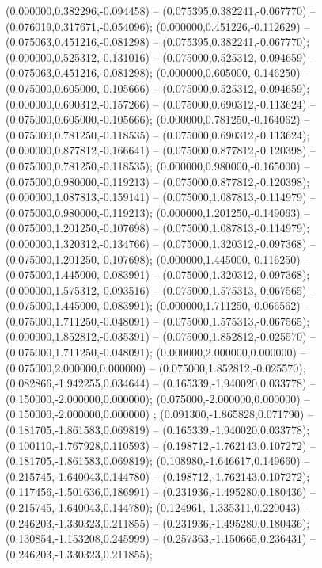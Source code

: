  (0.000000,0.382296,-0.094458) -- (0.075395,0.382241,-0.067770) -- (0.076019,0.317671,-0.054096);
 (0.000000,0.451226,-0.112629) -- (0.075063,0.451216,-0.081298) -- (0.075395,0.382241,-0.067770);
 (0.000000,0.525312,-0.131016) -- (0.075000,0.525312,-0.094659) -- (0.075063,0.451216,-0.081298);
 (0.000000,0.605000,-0.146250) -- (0.075000,0.605000,-0.105666) -- (0.075000,0.525312,-0.094659);
 (0.000000,0.690312,-0.157266) -- (0.075000,0.690312,-0.113624) -- (0.075000,0.605000,-0.105666);
 (0.000000,0.781250,-0.164062) -- (0.075000,0.781250,-0.118535) -- (0.075000,0.690312,-0.113624);
 (0.000000,0.877812,-0.166641) -- (0.075000,0.877812,-0.120398) -- (0.075000,0.781250,-0.118535);
 (0.000000,0.980000,-0.165000) -- (0.075000,0.980000,-0.119213) -- (0.075000,0.877812,-0.120398);
 (0.000000,1.087813,-0.159141) -- (0.075000,1.087813,-0.114979) -- (0.075000,0.980000,-0.119213);
 (0.000000,1.201250,-0.149063) -- (0.075000,1.201250,-0.107698) -- (0.075000,1.087813,-0.114979);
 (0.000000,1.320312,-0.134766) -- (0.075000,1.320312,-0.097368) -- (0.075000,1.201250,-0.107698);
 (0.000000,1.445000,-0.116250) -- (0.075000,1.445000,-0.083991) -- (0.075000,1.320312,-0.097368);
 (0.000000,1.575312,-0.093516) -- (0.075000,1.575313,-0.067565) -- (0.075000,1.445000,-0.083991);
 (0.000000,1.711250,-0.066562) -- (0.075000,1.711250,-0.048091) -- (0.075000,1.575313,-0.067565);
 (0.000000,1.852812,-0.035391) -- (0.075000,1.852812,-0.025570) -- (0.075000,1.711250,-0.048091);
 (0.000000,2.000000,0.000000) -- (0.075000,2.000000,0.000000) -- (0.075000,1.852812,-0.025570);
 (0.082866,-1.942255,0.034644) -- (0.165339,-1.940020,0.033778) -- (0.150000,-2.000000,0.000000);
 (0.075000,-2.000000,0.000000) -- (0.150000,-2.000000,0.000000) ;
 (0.091300,-1.865828,0.071790) -- (0.181705,-1.861583,0.069819) -- (0.165339,-1.940020,0.033778);
 (0.100110,-1.767928,0.110593) -- (0.198712,-1.762143,0.107272) -- (0.181705,-1.861583,0.069819);
 (0.108980,-1.646617,0.149660) -- (0.215745,-1.640043,0.144780) -- (0.198712,-1.762143,0.107272);
 (0.117456,-1.501636,0.186991) -- (0.231936,-1.495280,0.180436) -- (0.215745,-1.640043,0.144780);
 (0.124961,-1.335311,0.220043) -- (0.246203,-1.330323,0.211855) -- (0.231936,-1.495280,0.180436);
 (0.130854,-1.153208,0.245999) -- (0.257363,-1.150665,0.236431) -- (0.246203,-1.330323,0.211855);
